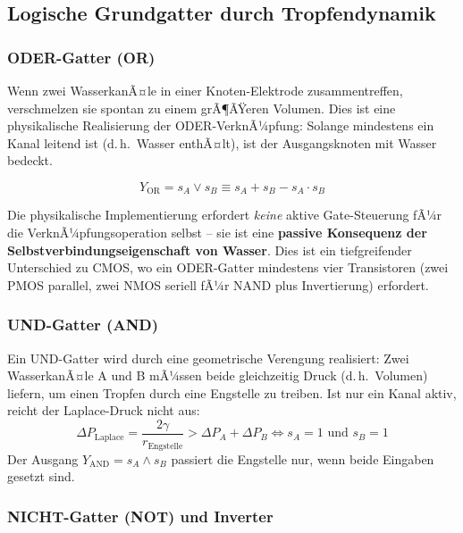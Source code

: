 ﻿\documentclass[a4paper,12pt]{scrreprt}
\theoremstyle{definition}
\begin{document}
\subsection{Logische Grundgatter durch Tropfendynamik}

\subsubsection{ODER-Gatter (OR)}

Wenn zwei WasserkanÃ¤le in einer Knoten-Elektrode zusammentreffen,
verschmelzen sie spontan zu einem grÃ¶ÃŸeren Volumen. Dies ist eine
physikalische Realisierung der ODER-VerknÃ¼pfung: Solange mindestens
ein Kanal leitend ist (d.\,h.\ Wasser enthÃ¤lt), ist der Ausgangsknoten
mit Wasser bedeckt.

\begin{equation}
	Y_{\mathrm{OR}} = s_{A} \lor s_{B} \equiv s_A + s_B - s_A \cdot s_B
	\label{eq:or_gatter}
\end{equation}

Die physikalische Implementierung erfordert \emph{keine} aktive Gate-Steuerung
fÃ¼r die VerknÃ¼pfungsoperation selbst -- sie ist eine \textbf{passive Konsequenz
	der Selbstverbindungseigenschaft von Wasser}. Dies ist ein tiefgreifender
Unterschied zu CMOS, wo ein ODER-Gatter mindestens vier Transistoren
(zwei PMOS parallel, zwei NMOS seriell fÃ¼r NAND plus Invertierung) erfordert.

\subsubsection{UND-Gatter (AND)}

Ein UND-Gatter wird durch eine geometrische Verengung realisiert: Zwei
WasserkanÃ¤le A und B mÃ¼ssen beide gleichzeitig Druck (d.\,h.\ Volumen) liefern,
um einen Tropfen durch eine Engstelle zu treiben. Ist nur ein Kanal aktiv,
reicht der Laplace-Druck nicht aus:
\begin{equation}
	\Delta P_{\mathrm{Laplace}} = \frac{2\gamma}{r_{\mathrm{Engstelle}}} > \Delta P_A + \Delta P_B
	\Leftrightarrow s_A = 1 \text{ und } s_B = 1
	\label{eq:und_bedingung}
\end{equation}
Der Ausgang $Y_{\mathrm{AND}} = s_A \land s_B$ passiert die Engstelle nur,
wenn beide Eingaben gesetzt sind.

\subsubsection{NICHT-Gatter (NOT) und Inverter}
\end{document}
